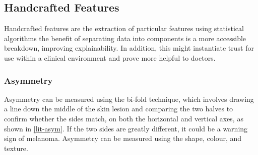 \subsection{Handcrafted Features}
Handcrafted features are the extraction of particular features using statistical algorithms the benefit of separating data into components is a more accessible breakdown, improving explainability. In addition, this might instantiate trust for use within a clinical environment and prove more helpful to doctors.

\subsubsection{Asymmetry}
Asymmetry can be measured using the bi-fold technique, which involves drawing a line down the middle of the skin lesion and comparing the two halves to confirm whether the sides match, on both the horizontal and vertical axes, as shown in \ref{lit-asym}. If the two sides are greatly different, it could be a warning sign of melanoma. Asymmetry can be measured using the shape\cite{Zaqout2016}, colour\cite{Kasmi2016}, and texture\cite{Ali2020a}.

